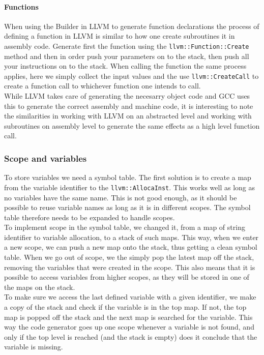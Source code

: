 \paragraph*{Functions}

When using the Builder in LLVM to generate function declarations the process of
defining a function in LLVM is similar to how one create subroutines it in assembly
code. Generate first the function using the \texttt{llvm::Function::Create} method and then in
order push your parameters on to the stack, then push all your instructions on to the
stack. When calling the function the same process applies, here we simply collect the
input values and the use \texttt{llvm::CreateCall} to create a function call to whichever
function one intends to call. \\

While LLVM takes care of generating the necesarry object code and GCC uses this to
generate the correct assembly and machine code, it is interesting to note the
similarities in working with LLVM on an abstracted level and working with subroutines on
assembly level to generate the same effects as a high level function call.


\subsubsection{Scope and variables}
To store variables we need a symbol table. The first solution is to create a map from
the variable identifier to the \texttt{llvm::AllocaInst}. This works well as long as
no variables have the same name. This is not good enough, as it should be possible to
reuse variable names as long as it is in different scopes. The symbol table therefore
needs to be expanded to handle scopes.\\ To implement scope in the symbol table, we
changed it, from a map of string identifier to variable allocation, to a stack of
such maps. This way, when we enter a new scope, we can push a new map onto the stack,
thus getting a clean symbol table. When we go out of scope, we the simply pop the
latest map off the stack, removing the variables that were created in the scope. This
also means that it is possible to access variables from higher scopes, as they will
be stored in one of the maps on the stack.\\

To make sure we access the last defined variable with a given identifier, we make a
copy of the stack and check if the variable is in the top map. If not, the top map
is popped off the stack and the next map is searched for the variable. This way the
code generator goes up one scope whenever a variable is not found, and only if the
top level is reached (and the stack is empty) does it conclude that the variable is
missing.

